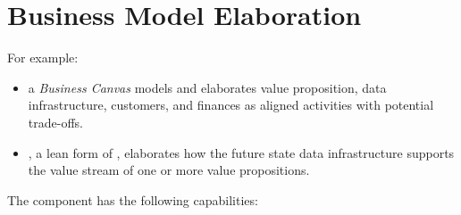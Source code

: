 \chapter{Business Model Elaboration}%
\label{ch:ekg-mm-a-2}
\label{ch:ekg-mm-business-model-elaboration}



For example:

\begin{itemize}
  \item a \textit{Business Canvas} models and elaborates
        value proposition,
        data infrastructure, customers, and
        finances as aligned activities with potential trade-offs.
  \item {}, a lean form of , elaborates how the future state data infrastructure
        supports the value stream of one or more value propositions.
\end{itemize}

The  component has the following capabilities:

\begin{itemize}[leftmargin=.5in]
\end{itemize}






